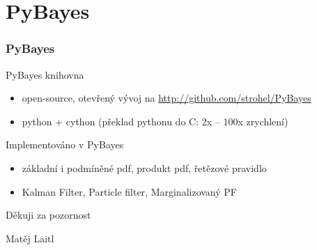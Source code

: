 \documentclass[12pt]{beamer}
\begin{document}
\section{PyBayes}

\begin{frame}
	\frametitle{PyBayes}

	\begin{block}{PyBayes knihovna}
		\begin{itemize}
			\item open-source, otevřený vývoj na \url{http://github.com/strohel/PyBayes}
			\item python + cython (překlad pythonu do C: 2x -- 100x zrychlení)
		\end{itemize}
	\end{block}

	\begin{block}{Implementováno v PyBayes}
		\begin{itemize}
			\item základní i podmíněné pdf, produkt pdf, řetězové pravidlo
			\item Kalman Filter, Particle filter, Marginalizovaný PF
		\end{itemize}
	\end{block}
\end{frame}

\begin{frame}
  \vspace{2cm}
  {\huge Děkuji za pozornost}

  \vspace{3cm}
  \begin{flushright}
    Matěj Laitl

  \end{flushright}
\end{frame}
\end{document}
